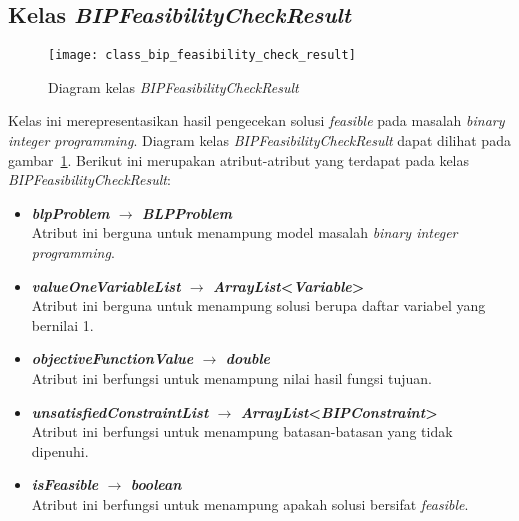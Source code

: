 \subsection{Kelas \textit{BIPFeasibilityCheckResult}}
\begin{figure}[H]
	\centering  
	\texttt{[image: class\_bip\_feasibility\_check\_result]}
	\caption[Diagram kelas \textit{BIPFeasibilityCheckResult}]{Diagram kelas \textit{BIPFeasibilityCheckResult}}
	\label{fig:class_bip_feasibility_check_result}
\end{figure}
Kelas ini merepresentasikan hasil pengecekan solusi \textit{feasible} pada masalah \textit{binary integer programming}. Diagram kelas \textit{BIPFeasibilityCheckResult} dapat dilihat pada gambar~\ref{fig:class_bip_feasibility_check_result}. Berikut ini merupakan atribut-atribut yang terdapat pada kelas \textit{BIPFeasibilityCheckResult}:
\begin{itemize}
	\item \textbf{\textit{blpProblem} $\rightarrow$ \textit{BLPProblem}}\\
	Atribut ini berguna untuk menampung model masalah \textit{binary integer programming}.
	\item \textbf{\textit{valueOneVariableList} $\rightarrow$ \textit{ArrayList}<\textit{\textit{Variable}}>}\\
	Atribut ini berguna untuk menampung solusi berupa daftar variabel yang bernilai 1.
	\item \textbf{\textit{objectiveFunctionValue} $\rightarrow$ \textit{double}}\\
	Atribut ini berfungsi untuk menampung nilai hasil fungsi tujuan.
	\item \textbf{\textit{unsatisfiedConstraintList} $\rightarrow$ \textit{ArrayList}<\textit{BIPConstraint}>}\\
	Atribut ini berfungsi untuk menampung batasan-batasan yang tidak dipenuhi.
	\item \textbf{\textit{isFeasible} $\rightarrow$ \textit{boolean}}\\
	Atribut ini berfungsi untuk menampung apakah solusi bersifat \textit{feasible}.
\end{itemize}

